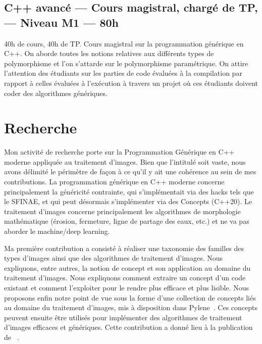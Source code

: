 \documentclass[11pt,a4paper,sans]{article} %
\begin{document}
\subsection{C++ avancé --- Cours magistral, chargé de TP, --- Niveau M1 --- 80h}

40h de cours, 40h de TP. Cours magistral sur la programmation générique en C++. On aborde toutes les notions relatives
aux différents types de polymorphisme et l'on s'attarde sur le polymorphisme paramétrique. On attire l'attention des
étudiants sur les parties de code évaluées à la compilation par rapport à celles évaluées à l'exécution à travers un
projet où ces étudiants doivent coder des algorithmes génériques.

\clearpage

\section{Recherche}

Mon activité de recherche porte sur la Programmation Générique en C++ moderne appliquée au traitement d'images. Bien que
l'intitulé soit vaste, nous avons délimité le périmètre de façon à ce qu'il y ait une cohérence au sein de mes
contributions. La programmation générique en C++ moderne concerne principalement la généricité contrainte, qui
s'implémentait via des hacks tels que le SFINAE, et qui peut désormais s'implémenter via des Concepts (C++20). Le
traitement d'images concerne principalement les algorithmes de morphologie mathématique (érosion, fermeture, ligne de
partage des eaux, etc.) et ne va pas aborder le machine/deep learning.

Ma première contribution a consisté à réaliser une taxonomie des familles des types d'images ainsi que des algorithmes
de traitement d'images. Nous expliquons, entre autres, la notion de concept et son application au domaine du traitement
d'images. Nous expliquons comment extraire un concept d'un code existant et comment l'exploiter pour le rendre plus
efficace et plus lisible. Nous proposons enfin notre point de vue sous la forme d'une collection de concepts liés au
domaine du traitement d'images, mis à disposition dans Pylene~\parencite{carlinet.2018.pylene}. Ces concepts peuvent
ensuite être utilisés pour implémenter des algorithmes de traitement d'images efficaces et génériques. Cette
contribution a donné lieu à la publication de ~\parencite{roynard.2019.rrpr}.
\end{document}
